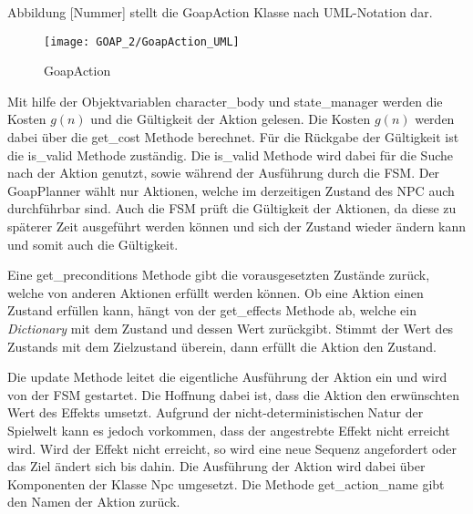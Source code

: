 Abbildung [Nummer] stellt die GoapAction Klasse nach UML-Notation dar.

\begin{figure}[h]
  \centering
  \texttt{[image: GOAP\_2/GoapAction\_UML]}
	\captionsetup{justification=justified, format=plain}
  \caption{GoapAction}
  \label{GoapAction}
\end{figure}

Mit hilfe der Objektvariablen character\_body und state\_manager werden die Kosten $g(n)$ und die Gültigkeit der Aktion gelesen. Die Kosten $g(n)$ werden dabei über die get\_cost Methode berechnet. Für die Rückgabe der Gültigkeit ist die is\_valid Methode zuständig. Die is\_valid Methode wird dabei für die Suche nach der Aktion genutzt, sowie während der Ausführung durch die FSM. Der GoapPlanner wählt nur Aktionen, welche im derzeitigen Zustand des NPC auch durchführbar sind. Auch die FSM prüft die Gültigkeit der Aktionen, da diese zu späterer Zeit ausgeführt werden können und sich der Zustand wieder ändern kann und somit auch die Gültigkeit.

Eine get\_preconditions Methode gibt die vorausgesetzten Zustände zurück, welche von anderen Aktionen erfüllt werden können. Ob eine Aktion einen Zustand erfüllen kann, hängt von der get\_effects Methode ab, welche ein \textit{Dictionary} mit dem Zustand und dessen Wert zurückgibt. Stimmt der Wert des Zustands mit dem Zielzustand überein, dann erfüllt die Aktion den Zustand.

Die update Methode leitet die eigentliche Ausführung der Aktion ein und wird von der FSM gestartet. Die Hoffnung dabei ist, dass die Aktion den erwünschten Wert des Effekts umsetzt. Aufgrund der nicht-deterministischen Natur der Spielwelt kann es jedoch vorkommen, dass der angestrebte Effekt nicht erreicht wird. Wird der Effekt nicht erreicht, so wird eine neue Sequenz angefordert oder das Ziel ändert sich bis dahin. Die Ausführung der Aktion wird dabei über Komponenten der Klasse Npc umgesetzt. Die Methode get\_action\_name gibt den Namen der Aktion zurück.

%

